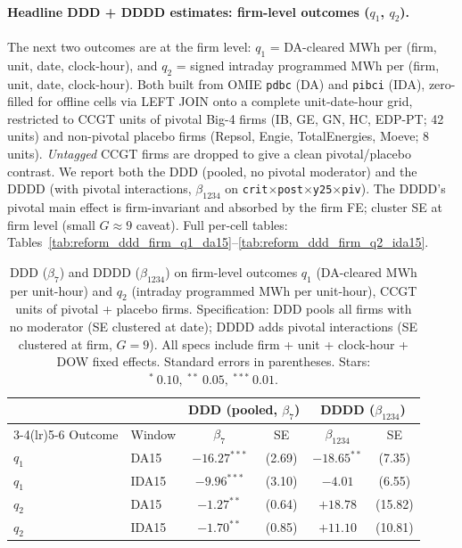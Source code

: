 \documentclass[11pt,a4paper]{article}
\newcommand{\code}[1]{\nolinkurl{#1}}
\begin{document}









\paragraph{Headline DDD + DDDD estimates: firm-level outcomes ($q_1$, $q_2$).}
The next two outcomes are at the firm level: $q_1$ = DA-cleared MWh per (firm, unit, date, clock-hour), and $q_2$ = signed intraday programmed MWh per (firm, unit, date, clock-hour). Both built from OMIE \code{pdbc} (DA) and \code{pibci} (IDA), zero-filled for offline cells via LEFT JOIN onto a complete unit-date-hour grid, restricted to CCGT units of pivotal Big-4 firms (IB, GE, GN, HC, EDP-PT; 42 units) and non-pivotal placebo firms (Repsol, Engie, TotalEnergies, Moeve; 8 units). \emph{Untagged} CCGT firms are dropped to give a clean pivotal/placebo contrast. We report both the DDD (pooled, no pivotal moderator) and the DDDD (with pivotal interactions, $\beta_{1234}$ on \texttt{crit$\times$post$\times$y25$\times$piv}). The DDDD's pivotal main effect is firm-invariant and absorbed by the firm FE; cluster SE at firm level (small $G \approx 9$ caveat). Full per-cell tables: Tables~\ref{tab:reform_ddd_firm_q1_da15}--\ref{tab:reform_ddd_firm_q2_ida15}.

\begin{table}[H]
\centering\footnotesize
\setlength{\tabcolsep}{4pt}
\caption{DDD ($\beta_7$) and DDDD ($\beta_{1234}$) on firm-level outcomes $q_1$ (DA-cleared MWh per unit-hour) and $q_2$ (intraday programmed MWh per unit-hour), CCGT units of pivotal + placebo firms. Specification: DDD pools all firms with no moderator (SE clustered at date); DDDD adds pivotal interactions (SE clustered at firm, $G = 9$). All specs include firm + unit + clock-hour + DOW fixed effects. Standard errors in parentheses. Stars: $^{*}~0.10,~^{**}~0.05,~^{***}~0.01$.}
\label{tab:reform_firm_summary}
\begin{tabular}{llcc|cc}
\toprule
& & \multicolumn{2}{c}{DDD (pooled, $\beta_7$)} & \multicolumn{2}{c}{DDDD ($\beta_{1234}$)} \\
\cmidrule(lr){3-4}\cmidrule(lr){5-6}
Outcome & Window & $\beta_7$ & SE & $\beta_{1234}$ & SE \\
\midrule
$q_1$ & DA15  & $-16.27^{***}$ & (2.69) & $-18.65^{**}$  & (7.35) \\
$q_1$ & IDA15 & $-9.96^{***}$  & (3.10) & $-4.01$        & (6.55) \\
$q_2$ & DA15  & $-1.27^{**}$   & (0.64) & $+18.78$       & (15.82) \\
$q_2$ & IDA15 & $-1.70^{**}$   & (0.85) & $+11.10$       & (10.81) \\
\bottomrule
\end{tabular}
\end{table}
\end{document}
